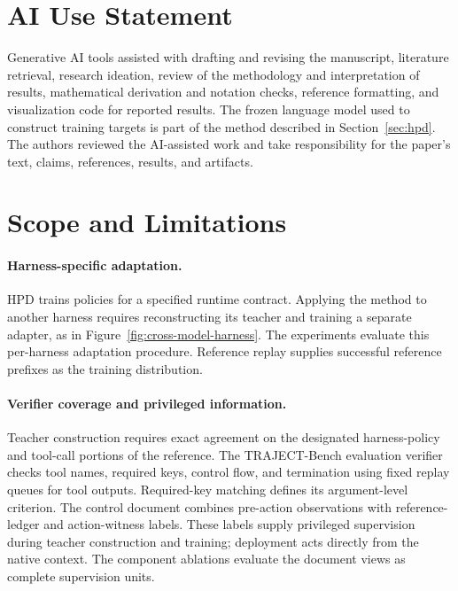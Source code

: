 \documentclass{article}
\newcommand{\hpd}{\textsc{HPD}}
\begin{document}
\section*{AI Use Statement}
Generative AI tools assisted with drafting and revising the manuscript,
literature retrieval, research ideation, review of the methodology and
interpretation of results, mathematical derivation and notation checks,
reference formatting, and visualization code for reported results. The
frozen language model used to construct training targets is part of the
method described in Section~\ref{sec:hpd}. The authors reviewed the
AI-assisted work and take responsibility for the paper's text, claims,
references, results, and artifacts.




\clearpage
\appendix

\FloatBarrier
\section{Scope and Limitations}
\label{sec:limitations}

\paragraph{Harness-specific adaptation.}
\hpd{} trains policies for a specified runtime contract. Applying the method to
another harness requires reconstructing its teacher and training a separate
adapter, as in Figure~\ref{fig:cross-model-harness}. The experiments evaluate
this per-harness adaptation procedure. Reference replay supplies successful
reference prefixes as the training distribution.

\paragraph{Verifier coverage and privileged information.}
Teacher construction requires exact agreement on the designated harness-policy
and tool-call portions of the reference. The TRAJECT-Bench evaluation verifier
checks tool names, required keys, control flow, and termination using fixed
replay queues for tool outputs. Required-key matching defines its
argument-level criterion. The control document combines pre-action
observations with reference-ledger and action-witness labels. These labels
supply privileged supervision during teacher construction and training;
deployment acts directly from the native context. The component ablations
evaluate the document views as complete supervision units.
\end{document}

